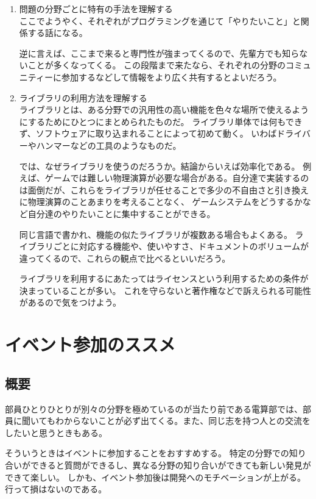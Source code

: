 \documentclass[lualatex,ja=standard,12pt,a4j]{bxjsbook}
\begin{document}
\begin{enumerate}
				\item 問題の分野ごとに特有の手法を理解する\\
                ここでようやく、それぞれがプログラミングを通じて「やりたいこと」と関係する話になる。
                
                逆に言えば、ここまで来ると専門性が強まってくるので、先輩方でも知らないことが多くなってくる。
                この段階まで来たなら、それぞれの分野のコミュニティーに参加するなどして情報をより広く共有するとよいだろう。
				
				\item ライブラリの利用方法を理解する\\
		        ライブラリとは、ある分野での汎用性の高い機能を色々な場所で使えるようにするためにひとつにまとめられたものだ。
		        ライブラリ単体では何もできず、ソフトウェアに取り込まれることによって初めて動く。
		        いわばドライバーやハンマーなどの工具のようなものだ。
		        
		        では、なぜライブラリを使うのだろうか。結論からいえば効率化である。
		        例えば、ゲームでは難しい物理演算が必要な場合がある。自分達で実装するのは面倒だが、これらをライブラリが任せることで多少の不自由さと引き換えに物理演算のことあまりを考えることなく、
		        ゲームシステムをどうするかなど自分達のやりたいことに集中することができる。
		        
		        同じ言語で書かれ、機能の似たライブラリが複数ある場合もよくある。
		        ライブラリごとに対応する機能や、使いやすさ、ドキュメントのボリュームが違ってくるので、これらの観点で比べるといいだろう。 
		        
		        ライブラリを利用するにあたってはライセンスという利用するための条件が決まっていることが多い。
		        これを守らないと著作権などで訴えられる可能性があるので気をつけよう。           
			\end{enumerate}
		\section{イベント参加のススメ}
			\subsection{概要}
				部員ひとりひとりが別々の分野を極めているのが当たり前である電算部では、部員に聞いてもわからないことが必ず出てくる。また、同じ志を持つ人との交流をしたいと思うときもある。
				
				そういうときはイベントに参加することをおすすめする。
				特定の分野での知り合いができると質問ができるし、異なる分野の知り合いができても新しい発見ができて楽しい。
				しかも、イベント参加後は開発へのモチベーションが上がる。
				行って損はないのである。
				
\end{document}
